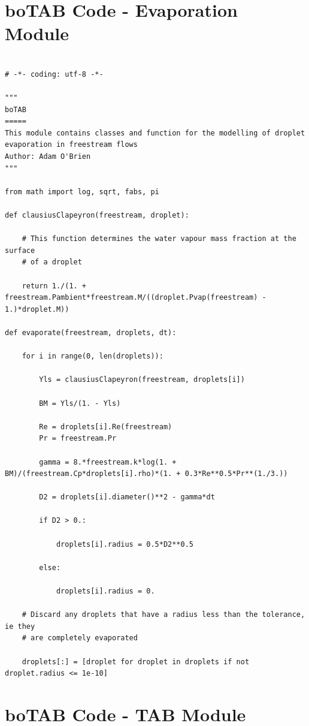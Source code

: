 \documentclass[12pt]{article}
\begin{document}
\newpage
\section{boTAB Code - Evaporation Module}

\begin{lstlisting}

# -*- coding: utf-8 -*-

"""
boTAB
=====
This module contains classes and function for the modelling of droplet
evaporation in freestream flows
Author: Adam O'Brien
"""

from math import log, sqrt, fabs, pi

def clausiusClapeyron(freestream, droplet):

    # This function determines the water vapour mass fraction at the surface
    # of a droplet

    return 1./(1. + freestream.Pambient*freestream.M/((droplet.Pvap(freestream) - 1.)*droplet.M))

def evaporate(freestream, droplets, dt):

    for i in range(0, len(droplets)):

        Yls = clausiusClapeyron(freestream, droplets[i])

        BM = Yls/(1. - Yls)

        Re = droplets[i].Re(freestream)
        Pr = freestream.Pr

        gamma = 8.*freestream.k*log(1. + BM)/(freestream.Cp*droplets[i].rho)*(1. + 0.3*Re**0.5*Pr**(1./3.))

        D2 = droplets[i].diameter()**2 - gamma*dt

        if D2 > 0.:

            droplets[i].radius = 0.5*D2**0.5

        else:

            droplets[i].radius = 0.

    # Discard any droplets that have a radius less than the tolerance, ie they
    # are completely evaporated

    droplets[:] = [droplet for droplet in droplets if not droplet.radius <= 1e-10]

\end{lstlisting}

\newpage
\section{boTAB Code - TAB Module}
\end{document}
